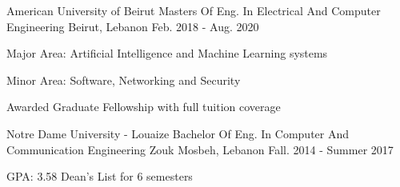 

\begin{cventries}

  \cventry
    {American University of Beirut} %
    {Masters Of Eng. In Electrical And Computer Engineering} %
    {Beirut, Lebanon} %
    {Feb. 2018 - Aug. 2020} %
    {
      \begin{cvitems} %
        \item Major Area: Artificial Intelligence and Machine Learning systems
        \item Minor Area: Software, Networking and Security
        \item {Awarded Graduate Fellowship with full tuition coverage }
      \end{cvitems}
    }

  \cventry
    {Notre Dame University - Louaize} %
    {Bachelor Of Eng. In Computer And Communication Engineering} %
    {Zouk Mosbeh, Lebanon} %
    {Fall. 2014 - Summer 2017} %
    {
      \begin{cvitems} %
        \item {GPA: 3.58 Dean’s List for 6 semesters}
      \end{cvitems}
    }




\end{cventries}

